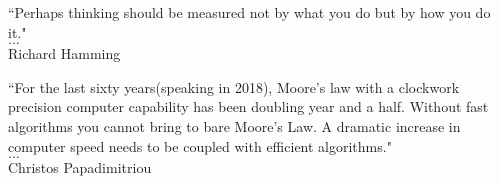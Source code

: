 \begin{center}
    ``Perhaps thinking should be measured not by what you do but by how you do it." \\$\dots$\\ Richard Hamming
\end{center}
\begin{center}
    ``For the last sixty years(speaking in 2018), Moore's law with a clockwork precision computer capability has been doubling year and a half. Without fast algorithms you cannot bring to bare Moore's Law. A dramatic increase in computer speed needs to be coupled with efficient algorithms." \\$\dots$\\ Christos Papadimitriou
\end{center}